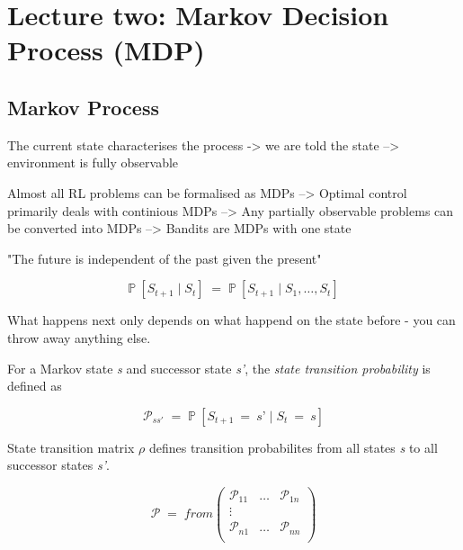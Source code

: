 \documentclass[10pt]{article}
\begin{document}
\section{Lecture two: Markov Decision Process (MDP)}
\subsection{Markov Process}

The current state characterises the process -> we are told the state --> environment is fully observable\newline

Almost all RL problems can be formalised as MDPs\newline
--> Optimal control primarily deals with continious MDPs\newline
--> Any partially observable problems can be converted into MDPs\newline
--> Bandits are MDPs with one state\newline

"The future is independent of the past given the present"

\begin{equation}
	\mathbb{P} \: [S_{t+1}\; | \; S_{t}] \; = \; \mathbb{P} \: [S_{t+1} \; | \; S_{1}, \ldots , S_{t}]
\end{equation}


What happens next only depends on what happend on the state before - you can throw away anything else.\newline

For a Markov state \textit{s} and successor state \textit{s'}, the \textit{state transition probability} is defined as

\begin{equation}
\mathcal{P}_{ss'} \; = \; \mathbb{P}\:[S_{t+1}\:=\:\textit{s'}\; | \; S_{t}\:=\:\textit{s}]
\end{equation}

State transition matrix $\rho$ defines transition probabilites from all states \textit{s} to all successor states \textit{s'}.

\begin{equation}
\mathcal{P} \; = \; from 
\begin{pmatrix}
\mathcal{P}_{11} & \ldots & \mathcal{P}_{1n} \\
\vdots & & \\
\mathcal{P}_{n1} & \ldots & \mathcal{P}_{nn} \\
\end{pmatrix}
\end{equation}
\end{document}
